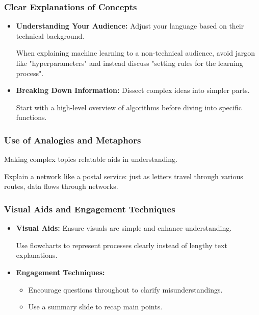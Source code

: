 \documentclass[aspectratio=169]{beamer}
\begin{document}
\begin{frame}[fragile]
    \frametitle{Clear Explanations of Concepts}
    \begin{itemize}
        \item \textbf{Understanding Your Audience:} 
        Adjust your language based on their technical background.
        \begin{example}
            When explaining machine learning to a non-technical audience, avoid jargon like "hyperparameters" and instead discuss "setting rules for the learning process".
        \end{example}

        \item \textbf{Breaking Down Information:} 
        Dissect complex ideas into simpler parts.
        \begin{example}
            Start with a high-level overview of algorithms before diving into specific functions.
        \end{example}
    \end{itemize}
\end{frame}

\begin{frame}[fragile]
    \frametitle{Use of Analogies and Metaphors}
    Making complex topics relatable aids in understanding.
    \begin{example}
        Explain a network like a postal service: just as letters travel through various routes, data flows through networks.
    \end{example}
\end{frame}

\begin{frame}[fragile]
    \frametitle{Visual Aids and Engagement Techniques}
    \begin{itemize}
        \item \textbf{Visual Aids:} 
        Ensure visuals are simple and enhance understanding.
        \begin{example}
            Use flowcharts to represent processes clearly instead of lengthy text explanations.
        \end{example}

        \item \textbf{Engagement Techniques:}
        \begin{itemize}
            \item Encourage questions throughout to clarify misunderstandings.
            \item Use a summary slide to recap main points.
        \end{itemize}
    \end{itemize}
\end{frame}
\end{document}
